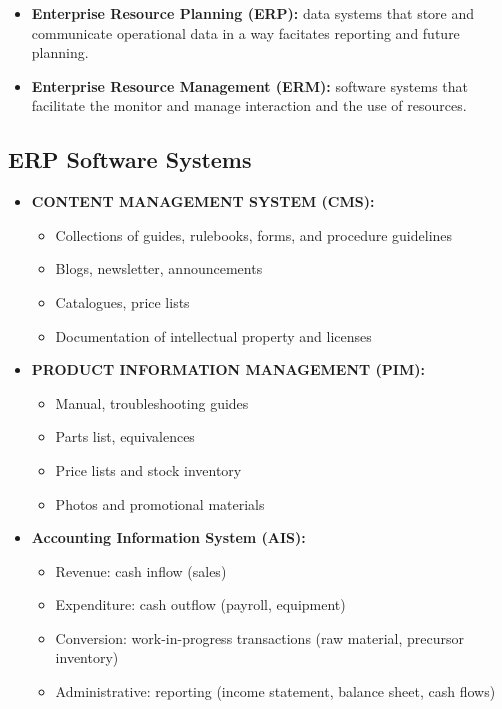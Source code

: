 \documentclass[]{book}
\providecommand{\tightlist}{%
  \setlength{\itemsep}{0pt}\setlength{\parskip}{0pt}}
\let\BeginKnitrBlock\begin \let\EndKnitrBlock\end
\begin{document}
\begin{itemize}
\item
  \textbf{Enterprise Resource Planning (ERP):} data systems that store and communicate operational data in a way facitates reporting and future planning.
\item
  \textbf{Enterprise Resource Management (ERM):} software systems that facilitate the monitor and manage interaction and the use of resources.
\end{itemize}

\BeginKnitrBlock{rmdextra}
\hypertarget{erp-software-systems}{%
\section*{ERP Software Systems}\label{erp-software-systems}}

\begin{itemize}
\item
  \textbf{CONTENT MANAGEMENT SYSTEM (CMS):}

  \begin{itemize}
  \tightlist
  \item
    Collections of guides, rulebooks, forms, and procedure guidelines
  \item
    Blogs, newsletter, announcements
  \item
    Catalogues, price lists
  \item
    Documentation of intellectual property and licenses
  \end{itemize}
\item
  \textbf{PRODUCT INFORMATION MANAGEMENT (PIM):}

  \begin{itemize}
  \tightlist
  \item
    Manual, troubleshooting guides
  \item
    Parts list, equivalences
  \item
    Price lists and stock inventory
  \item
    Photos and promotional materials
  \end{itemize}
\item
  \textbf{Accounting Information System (AIS):}

  \begin{itemize}
  \tightlist
  \item
    Revenue: cash inflow (sales)
  \item
    Expenditure: cash outflow (payroll, equipment)
  \item
    Conversion: work-in-progress transactions (raw material, precursor inventory)
  \item
    Administrative: reporting (income statement, balance sheet, cash flows)
  \end{itemize}
\end{itemize}
\EndKnitrBlock{rmdextra}
\end{document}
